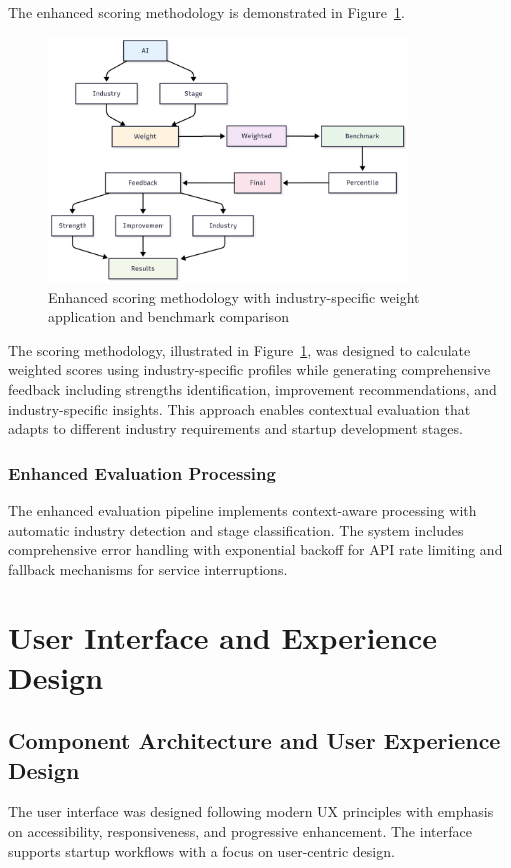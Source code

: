 The enhanced scoring methodology is demonstrated in Figure~\ref{fig:eval-flow-scoring}.

\begin{figure}[H]
  \centering
  \includegraphics[width=0.85\textwidth]{img/eval-flow-scoring}
  \caption{Enhanced scoring methodology with industry-specific weight application and benchmark comparison}
  \label{fig:eval-flow-scoring}
\end{figure}

The scoring methodology, illustrated in Figure~\ref{fig:eval-flow-scoring}, was designed to calculate weighted scores using industry-specific profiles while generating comprehensive feedback including strengths identification, improvement recommendations, and industry-specific insights. This approach enables contextual evaluation that adapts to different industry requirements and startup development stages.

\subsubsection{Enhanced Evaluation Processing}
The enhanced evaluation pipeline implements context-aware processing with automatic industry detection and stage classification. The system includes comprehensive error handling with exponential backoff for API rate limiting and fallback mechanisms for service interruptions.

\section{User Interface and Experience Design}

\subsection{Component Architecture and User Experience Design}
The user interface was designed following modern UX principles with emphasis on accessibility, responsiveness, and progressive enhancement. The interface supports startup workflows with a focus on user-centric design.

